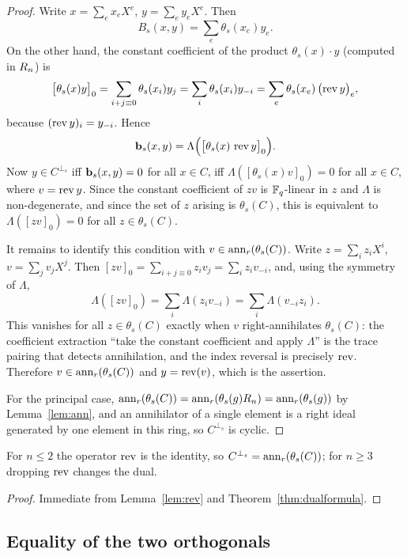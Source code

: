 \begin{proof}
Write $x=\sum_ex_eX^e$, $y=\sum_ey_eX^e$. Then
\[
  B_s(x,y)=\sum_e\theta_s(x_e)y_e .
\]
On the other hand, the constant coefficient of the product
$\theta_s(x)\cdot y$ (computed in $R_n$) is
\[
  \bigl[\theta_s(x)y\bigr]_0
  =\sum_{i+j\equiv0}\theta_s(x_i)y_j
  =\sum_i\theta_s(x_i)y_{-i}
  =\sum_e\theta_s(x_e)\,\bigl(\operatorname{rev} y\bigr)_e ,
\]
because $(\operatorname{rev} y)_i=y_{-i}$. Hence
\[
  \mathbf b_s(x,y)=\Lambda\Bigl(\bigl[\theta_s(x)\,\operatorname{rev} y\bigr]_0\Bigr).
\]
Now $y\in C^{\perp_s}$ iff $\mathbf b_s(x,y)=0$ for all $x\in C$, iff
$\Lambda([\theta_s(x)v]_0)=0$ for all $x\in C$, where $v=\operatorname{rev} y$. Since the
constant coefficient of $zv$ is $\mathbb F_q$-linear in $z$ and $\Lambda$ is
non-degenerate, and since the set of $z$ arising is $\theta_s(C)$, this is
equivalent to $\Lambda([zv]_0)=0$ for all $z\in\theta_s(C)$.

It remains to identify this condition with $v\in\operatorname{ann}_r(\theta_s(C))$. Write
$z=\sum_iz_iX^i$, $v=\sum_jv_jX^j$. Then
$[zv]_0=\sum_{i+j\equiv0}z_iv_j=\sum_iz_iv_{-i}$, and, using the symmetry of
$\Lambda$,
\[
  \Lambda([zv]_0)=\sum_i\Lambda(z_iv_{-i})
  =\sum_i\Lambda(v_{-i}z_i).
\]
This vanishes for all $z\in\theta_s(C)$ exactly when $v$ right-annihilates
$\theta_s(C)$: the coefficient extraction ``take the constant coefficient and
apply $\Lambda$'' is the trace pairing that detects annihilation, and the index
reversal is precisely $\operatorname{rev}$. Therefore $v\in\operatorname{ann}_r(\theta_s(C))$ and
$y=\operatorname{rev}(v)$, which is the assertion.

For the principal case, $\operatorname{ann}_r(\theta_s(C))=\operatorname{ann}_r(\theta_s(g)R_n)
=\operatorname{ann}_r(\theta_s(g))$ by Lemma~\ref{lem:ann}, and an annihilator of a single
element is a right ideal generated by one element in this ring, so
$C^{\perp_s}$ is cyclic.
\end{proof}

\begin{corollary}
\label{cor:rev}
For $n\le2$ the operator $\operatorname{rev}$ is the identity, so
$C^{\perp_s}=\operatorname{ann}_r(\theta_s(C))$; for $n\ge3$ dropping $\operatorname{rev}$ changes the dual.
\end{corollary}

\begin{proof}
Immediate from Lemma~\ref{lem:rev} and Theorem~\ref{thm:dualformula}.
\end{proof}

\subsection{Equality of the two orthogonals}

